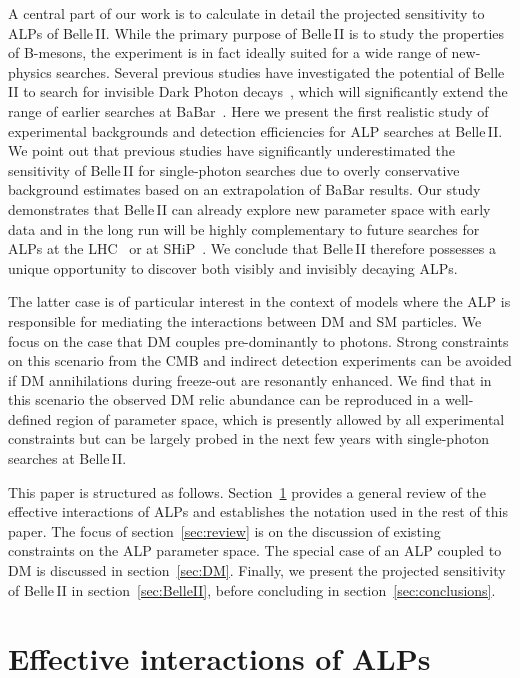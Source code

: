 \documentclass[11pt,a4paper]{article}
\def \belletwo {Belle\,II\xspace}
\def \babar {BaBar\xspace}
\begin{document}
A central part of our work is to calculate in detail the projected sensitivity to ALPs of \belletwo. While the primary purpose of \belletwo is to study the properties of B-mesons, the experiment is in fact ideally suited for a wide range of new-physics searches. Several previous studies have investigated the potential of \belletwo to search for invisible Dark Photon decays~\cite{Essig:2013vha,Izaguirre:2013uxa,lit:b2tip}, which will significantly extend the range of earlier searches at \babar~\cite{Aubert:2008as,delAmoSanchez:2010ac,Lees:2017lec}. Here we present the first realistic study of experimental backgrounds and detection efficiencies for ALP searches at \belletwo. We point out that previous studies have significantly underestimated the sensitivity of \belletwo for single-photon searches due to overly conservative background estimates based on an extrapolation of \babar results. Our study demonstrates that \belletwo can already explore new parameter space with early data and in the long run will be highly complementary to future searches for ALPs at the LHC~\cite{Bauer:2017ris} or at SHiP~\cite{Alekhin:2015byh,Dobrich:2015jyk}. We conclude that \belletwo therefore possesses a unique opportunity to discover both visibly and invisibly decaying ALPs.

The latter case is of particular interest in the context of models where the ALP is responsible for mediating the interactions between DM and SM particles. We focus on the case that DM couples pre-dominantly to photons. Strong constraints on this scenario from the CMB and indirect detection experiments can be avoided if DM annihilations during freeze-out are resonantly enhanced. We find that in this scenario the observed DM relic abundance can be reproduced in a well-defined region of parameter space, which is presently allowed by all experimental constraints but can be largely probed in the next few years with single-photon searches at \belletwo.

This paper is structured as follows. Section~\ref{sec:ALPs} provides a general review of the effective interactions of ALPs and establishes the notation used in the rest of this paper. The focus of section~\ref{sec:review} is on the discussion of existing constraints on the ALP parameter space. The special case of an ALP coupled to DM is discussed in section~\ref{sec:DM}. Finally, we present the projected sensitivity of \belletwo in section~\ref{sec:BelleII}, before concluding in section~\ref{sec:conclusions}.

\section{Effective interactions of ALPs}
\label{sec:ALPs}
\end{document}
